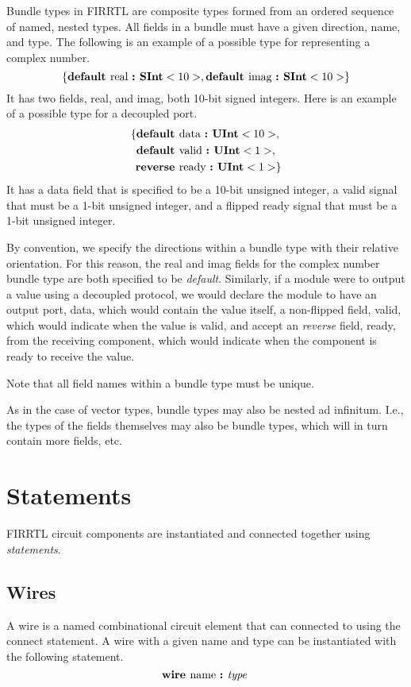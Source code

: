 \documentclass[12pt]{article}
\begin{document}
Bundle types in FIRRTL are composite types formed from an ordered sequence of named, nested types.
All fields in a bundle must have a given direction, name, and type.
The following is an example of a possible type for representing a complex number.
\[
\{\text{\bf default\ } \text{real } \text{\bf :\ } \text{\bf SInt}<10>,
         \text{\bf default\ } \text{imag } \text{\bf :\ } \text{\bf SInt}<10>\}
\]
It has two fields, real, and imag, both 10-bit signed integers.
Here is an example of a possible type for a decoupled port. 
\[
\begin{aligned}
\{ \text{\bf default\ } &\text{data } \text{\bf :\ } \text{\bf UInt}<10>, \\
   \text{\bf default\ } &\text{valid } \text{\bf :\ } \text{\bf UInt}<1>, \\
   \text{\bf reverse\ } &\text{ready } \text{\bf :\ } \text{\bf UInt}<1>\} \\
\end{aligned}
\]
It has a data field that is specified to be a 10-bit unsigned integer, a valid signal that must be a 1-bit unsigned integer, and a flipped ready signal that must be a 1-bit unsigned integer.

By convention, we specify the directions within a bundle type with their relative orientation.
For this reason, the real and imag fields for the complex number bundle type are both specified to be {\em default}.
Similarly, if a module were to output a value using a decoupled protocol, we would declare the module to have an output port, data, which would contain the value itself, a non-flipped field, valid, which would indicate when the value is valid, and accept an {\em reverse} field, ready, from the receiving component, which would indicate when the component is ready to receive the value.

Note that all field names within a bundle type must be unique.

As in the case of vector types, bundle types may also be nested ad infinitum.
I.e., the types of the fields themselves may also be bundle types, which will in turn contain more fields, etc. 

\section{Statements}

FIRRTL circuit components are instantiated and connected together using {\em statements}.

\subsection{Wires}
A wire is a named combinational circuit element that can connected to using the connect statement.
A wire with a given name and type can be instantiated with the following statement.
\[
\text{\bf wire\ } \text{name } \text{\bf :\ } \text{\em type\ } \\
\]
\end{document}
